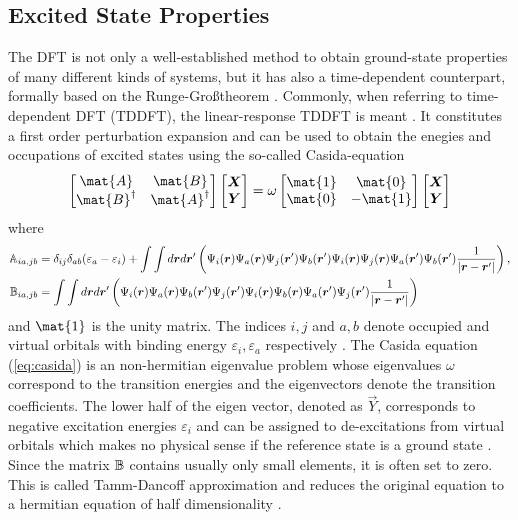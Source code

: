 \subsection{Excited State Properties}
The DFT is not only a well-established method to obtain ground-state properties of many different kinds of systems, but it has also a time-dependent counterpart, formally based on the Runge-Gro\ss theorem \cite{RungeGross}.
Commonly, when referring to time-dependent DFT (TDDFT), the linear-response TDDFT is meant \cite{dreuw}.
It constitutes a first order perturbation expansion and can be used to obtain the enegies and occupations of excited states using the so-called Casida-equation \cite{casida}
\begin{equation} \label{eq:casida}
\begin{bmatrix} \mat{A} & \mat{B} \\ \mat{B}^\dagger & \mat{A}^\dagger\end{bmatrix}
\begin{bmatrix} \vec{X} \\ \vec{Y} \end{bmatrix} =
\omega \begin{bmatrix} \mat{1} & \mat{0} \\ \mat{0} & -\mat{1}\end{bmatrix}
\begin{bmatrix} \vec{X} \\ \vec{Y} \end{bmatrix}
\end{equation}
where 
\begin{align}
\mathbb{A}_{ia,jb}& =\delta_{ij}\delta_{ab}(\varepsilon_a-\varepsilon_i)+ 
\int \int d\bm{r} d\bm{r}'\left( \Psi_i(\bm{r}) \Psi_a(\bm{r})  \Psi_j(\bm{r}') \Psi_b(\bm{r}') 
\Psi_i(\bm{r}) \Psi_j(\bm{r}) \Psi_a(\bm{r}') \Psi_b(\bm{r}') \frac{1}{|\bm{r}-\bm{r}'|}  \right) ,\\
\mathbb{B}_{ia,jb}& = \int \int d\bm{r} d\bm{r}'\left( \Psi_i(\bm{r}) \Psi_a(\bm{r})  \Psi_b(\bm{r}') \Psi_j(\bm{r}') 
\Psi_i(\bm{r}) \Psi_b(\bm{r})  \Psi_a(\bm{r}') \Psi_j(\bm{r}') \frac{1}{|\bm{r}-\bm{r}'|}  \right) 
\end{align}
and $\mat{1}$ is the unity matrix.
The indices $i,j$ and $a,b$ denote occupied and virtual orbitals with binding energy $\varepsilon_i, \varepsilon_a$ respectively \cite{dreuw}.
The Casida equation (\ref{eq:casida}) is an non-hermitian eigenvalue problem whose eigenvalues $\omega$ correspond to the transition energies and the eigenvectors denote the transition coefficients.
The lower half of the eigen vector, denoted as $\vec{Y}$, corresponds to negative excitation energies $\varepsilon_i$ and can be assigned to de-excitations from virtual orbitals which makes no physical sense if the reference state is a ground state \cite{dreuw}.
Since the matrix $\mathbb{B}$ contains usually only small elements, it is often set to zero.
This is called Tamm-Dancoff approximation and reduces the original equation to a hermitian equation of half dimensionality \cite{casida}.

